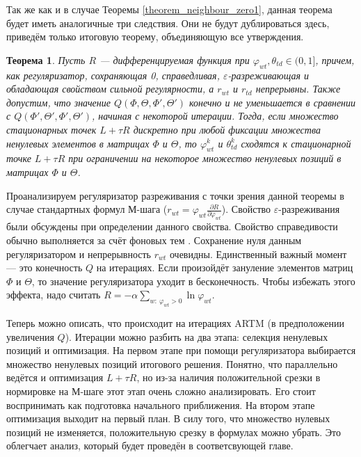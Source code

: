 \documentclass[12pt]{article}
\newtheorem{theorem}{Теорема}
\renewcommand{\phi}{\varphi}
\begin{document}
Так же как и в случае Теоремы \ref{theorem_neighbour_zero1}, данная теорема будет иметь аналогичные три следствия. Они не будут дублироваться здесь, приведём только итоговую теорему, объединяющую все утверждения.
\begin{theorem} \label{theorem_convergence1} Пусть $R$ --- дифференцируемая функция при $\phi_{wt}, \theta_{td} \in (0, 1]$, причем, как регуляризатор, сохраняющая 0, справедливая, $\varepsilon$-разреживающая и обладающая свойством сильной регулярности, а  $r_{wt}$ и $r_{td}$ непрерывны. Также допустим,  что значение $Q(\Phi, \Theta, \Phi', \Theta')$ конечно и не уменьшается в сравнении с $Q(\Phi', \Theta', \Phi', \Theta')$, начиная с некоторой итерации. Тогда, если множество стационарных точек $L + \tau R$ дискретно при любой фиксации множества ненулевых элементов в матрицах $\Phi$ и $\Theta$, то $\phi_{wt}^{k}$ и $\theta_{td}^{k}$ сходятся к стационарной точке $L + \tau R$ при ограничении на некоторое множество ненулевых позиций в матрицах $\Phi$ и $\Theta$.
\end{theorem}

Проанализируем регуляризатор разреживания с точки зрения данной теоремы в случае стандартных формул М-шага ($r_{wt} = \phi_{wt}\frac{\partial{R}}{\partial{\phi_{wt}}}$). Свойство $\varepsilon$-разреживания были обсуждены при определении данного свойства. Свойство справедивости обычно выполняется за счёт фоновых тем \cite{artmdef2} . Сохранение нуля данным регуляризатором и непрерывность $r_{wt}$ очевидны. Единственный важный момент --- это конечность $Q$ на итерациях. Если произойдёт зануление элементов матриц $\Phi$ и $\Theta$, то значение регуляризатора уходит в бесконечность. Чтобы избежать этого эффекта, надо считать $R = -\alpha \sum\limits_{w\colon~\phi_{wt} > 0} \ln\phi_{wt}$.

Теперь можно описать, что происходит на итерациях ARTM (в предположении увеличения $Q$). Итерации можно разбить на два этапа: селекция ненулевых позиций и оптимизация. На первом этапе при помощи регуляризатора выбирается множество ненулевых позиций итогового решения. Понятно, что параллельно ведётся и оптимизация $L + \tau R$, но из-за наличия положительной срезки в нормировке на М-шаге этот этап очень сложно анализировать. Его стоит воспринимать как подготовка начального приближения. На втором этапе оптимизация выходит на первый план. В силу того, что множество нулевых позиций не изменяется, положительную срезку в формулах можно убрать. Это облегчает анализ, который будет проведён в соответсвующей главе.
\end{document}
